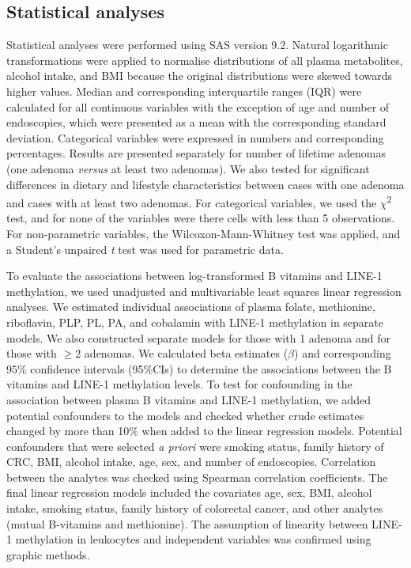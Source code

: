 \subsection{Statistical analyses} %
\noindent Statistical analyses were performed using SAS version 9.2. Natural logarithmic transformations were applied to normalise distributions of all plasma metabolites, alcohol intake, and BMI because the original distributions were skewed towards higher values. Median and corresponding interquartile ranges (IQR) were calculated for all continuous variables with the exception of age and number of endoscopies, which were presented as a mean with the corresponding standard deviation. Categorical variables were expressed in numbers and corresponding percentages. Results are presented separately for number of lifetime adenomas (one adenoma \emph{versus} at least two adenomas). We also tested for significant differences in dietary and lifestyle characteristics between cases with one adenoma and cases with at least two adenomas. For categorical variables, we used the $\chi$\textsuperscript{2} test, and for none of the variables were there cells with less than 5 observations. For non-parametric variables, the Wilcoxon-Mann-Whitney test was applied, and a Student's unpaired \emph{t} test was used for parametric data.

\noindent To evaluate the associations between log-transformed B vitamins and LINE-1 methylation, we used unadjusted and multivariable least squares linear regression analyses. We estimated individual associations of plasma folate, methionine, riboflavin, PLP, PL, PA, and cobalamin with LINE-1 methylation in separate models. We also constructed separate models for those with 1 adenoma and for those with $\geq$2 adenomas. We calculated beta estimates ($\beta$) and corresponding 95\% confidence intervals (95\%CIs) to determine the associations between the B vitamins and LINE-1 methylation levels. To test for confounding in the association between plasma B vitamins and LINE-1 methylation, we added potential confounders to the models and checked whether crude estimates changed by more than 10\% when added to the linear regression models. Potential confounders that were selected \emph{a priori} were smoking status, family history of CRC, BMI, alcohol intake, age, sex, and number of endoscopies. Correlation between the analytes was checked using Spearman correlation coefficients. The final linear regression models included the covariates age, sex, BMI, alcohol intake, smoking status, family history of colorectal cancer, and other analytes (mutual B-vitamins and methionine). The assumption of linearity between LINE-1 methylation in leukocytes and independent variables was confirmed using graphic methods.


